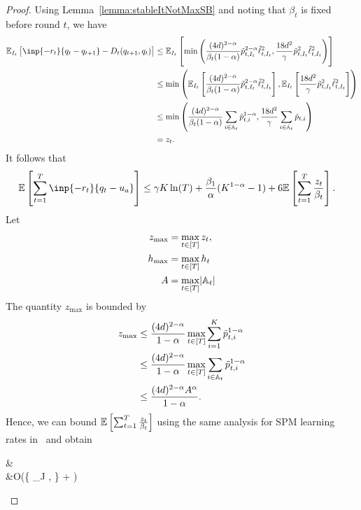 \begin{proof}
Using Lemma~\ref{lemma:stableItNotMaxSB} and noting that $\beta_t$ is fixed before round $t$, we have
\begin{align*}
    \E_{I_t}\left[ \inp{-r_t}{q_t - q_{t+1}} - D_t(q_{t+1}, q_t) \right] &\leq \E_{I_t}\left[\min\left( \frac{(4d)^{2-\alpha}}{\beta_t(1-\alpha)}\tilde{p}_{t,I_t}^{2-\alpha}\hat{\ell}^2_{t,I_t}, \frac{18d^2}{\gamma} \tilde{p}_{t,I_t}^2 \hat{\ell}_{t,I_t}^2  \right)\right] \\
    &\leq \min\left(\E_{I_t}\left[ \frac{(4d)^{2-\alpha}}{\beta_t(1-\alpha)}\tilde{p}_{t,I_t}^{2-\alpha}\hat{\ell}^2_{t,I_t} \right], \E_{I_t}\left[ \frac{18d^2}{\gamma} \tilde{p}_{t,I_t}^2 \hat{\ell}_{t,I_t}^2 \right]\right) \\
    &\leq \min\left( \frac{(4d)^{2-\alpha}}{\beta_t(1-\alpha)}\sum_{i \in \sA_t}\tilde{p}_{t,i}^{1-\alpha}, \frac{18d^2}{\gamma}\sum_{i \in \sA_t}\tilde{p}_{t,i} \right) \\
    &= z_t.
\end{align*}
It follows that
\begin{align*}
    \E\left[\sum_{t=1}^T \inp{-r_t}{q_t - u_a}\right] &\leq \gamma K\ln(T) + \frac{\beta_1}{\alpha}(K^{1-\alpha}-1) + 6\E\left[\sum_{t=1}^T \frac{z_t}{\beta_t} \right].
\end{align*}
Let 
\begin{align*}
    z_{\max} &= \max_{t \in [T]}z_t, \\
    h_{\max} &= \max_{t \in [T]}h_t \\
    A &= \max_{t \in [T]}\abs{{\mathbb{A}}_t}
\end{align*}
The quantity $z_{\max}$ is bounded by
\begin{align*}
    z_{\max} &\leq \frac{(4d)^{2-\alpha}}{1-\alpha}\max_{t \in [T]} \sum_{i=1}^K \tilde{p}_{t,i}^{1-\alpha} \\
    &\leq  \frac{(4d)^{2-\alpha}}{1-\alpha}\max_{t \in [T]} \sum_{i \in {\mathbb{A}}_t} \tilde{p}_{t,i}^{1-\alpha} \\
    &\leq \frac{(4d)^{2-\alpha}A^\alpha}{1-\alpha}.
\end{align*}
Hence, we can bound $\mathbb{E}\left[\sum_{t=1}^T \frac{z_t}{\beta_t} \right]$ using the same analysis for SPM learning rates in~\cite{ItoCOLT2024} and obtain
\begin{nalign}
    &\E\left[\sum_{t=1}^T \frac{z'_t}{\beta_t} \right] \\ &\leq O\left(\min\left\{ \inf_{J \in \sN}\E\left[\left\{ \sqrt{8J\sum_{t=1}^T h_t z_t} + 2\sqrt{2^{-J}Th_{\max}{z_{\max}}} \right\}\right], \E{} \right\} + \E{}\right) \\

\end{nalign}
\end{proof}
